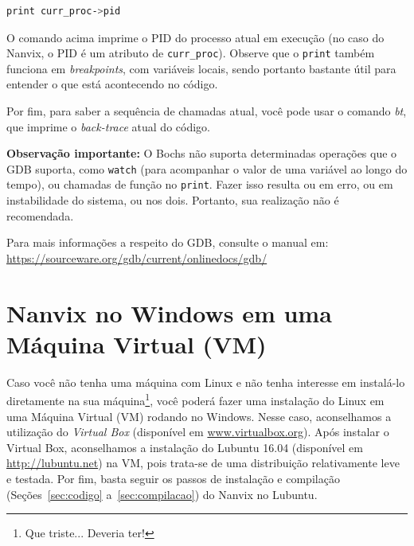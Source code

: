 \documentclass[11pt]{article}
\begin{document}
\begin{lstlisting}[language=sh,numbers=none,frame=single]
print curr_proc->pid
\end{lstlisting}

O comando acima imprime o PID do processo atual em execução (no caso do Nanvix, o PID é um atributo de \texttt{curr\_proc}). Observe que o \texttt{print} também funciona em \textit{breakpoints}, com variáveis locais, sendo portanto bastante útil para entender o que está acontecendo no código.

Por fim, para saber a sequência de chamadas atual, você pode usar o comando \textit{bt}, que imprime o \textit{back-trace} atual do código.

\textbf{Observação importante:} O Bochs não suporta determinadas operações que o GDB suporta, como \texttt{watch} (para acompanhar o valor de uma variável ao longo do tempo), ou chamadas de função no \texttt{print}. Fazer isso resulta ou em erro, ou em instabilidade do sistema, ou nos dois. Portanto, sua realização não é recomendada. 

Para mais informações a respeito do GDB, consulte o manual em: \url{https://sourceware.org/gdb/current/onlinedocs/gdb/}

\section{Nanvix no Windows em uma Máquina Virtual (VM)}
\label{sec:vm}

Caso você não tenha uma máquina com Linux e não tenha interesse em instalá-lo diretamente na sua máquina\footnote{Que triste... Deveria ter!}, você poderá fazer uma instalação do Linux em uma Máquina Virtual (VM) rodando no Windows. Nesse caso, aconselhamos a utilização do \textit{Virtual Box}
(disponível em \url{www.virtualbox.org}). Após instalar o Virtual Box, aconselhamos a instalação do Lubuntu 16.04 (disponível em \url{http://lubuntu.net}) na VM, pois trata-se de uma distribuição relativamente leve e testada. Por fim, basta seguir os passos de instalação e compilação (Seções~\ref{sec:codigo} a~\ref{sec:compilacao}) do Nanvix no Lubuntu.
\end{document}
